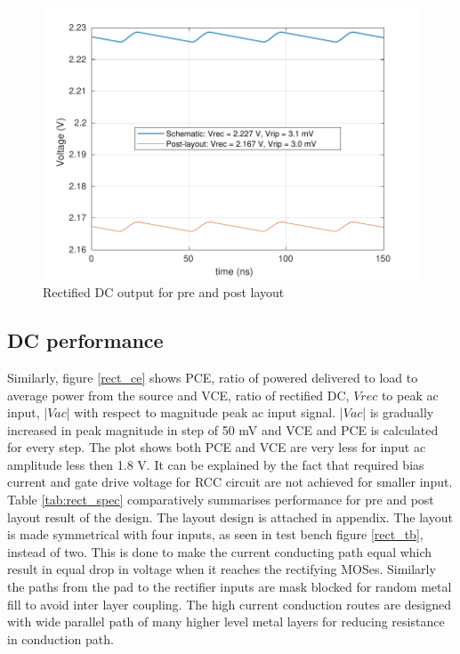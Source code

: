 \documentclass[12pt,a4paper,UKenglish]{report}
\begin{document}
\begin{figure}[H] %
   \centering
   \includegraphics[width=\textwidth]{img/rectifier_ripple.pdf} 
   \caption{Rectified DC output for pre and post layout}
   \label{fig:rect_ripple}
\end{figure}

\subsection{DC performance}		%

Similarly, figure  \ref{rect_ce} shows PCE, ratio of powered delivered to load to average power from the source and 
VCE, ratio of rectified DC, $Vrec$ to peak ac input, |$Vac$| with respect to magnitude peak ac input signal. |$Vac$| is gradually increased in 
peak magnitude in step of 50 mV and VCE and PCE is calculated for every step. The plot shows both 
PCE and VCE are very less for input ac amplitude less then 1.8 V. It can be explained by the fact that required 
bias current and gate drive voltage for RCC circuit are not achieved for smaller input. \\

Table \ref{tab:rect_spec} comparatively summarises performance for pre and post layout result of the design. The layout design is attached in appendix. The layout 
is made symmetrical with four inputs, as seen in test bench figure \ref{rect_tb}, instead of two. This is done to make the current conducting path equal which result in 
equal drop in voltage when it reaches the rectifying MOSes. Similarly the paths from the pad to the rectifier inputs are mask blocked for random metal fill to avoid 
inter layer coupling. The high current conduction routes are designed with wide parallel path of many higher level metal layers for reducing resistance in conduction path.
\end{document}
